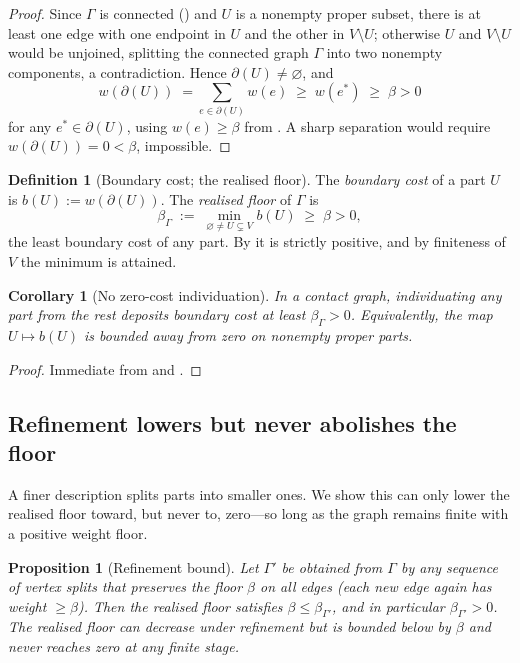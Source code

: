 \documentclass[11pt,a4paper]{article}
\theoremstyle{thmstyle}
\newtheorem{proposition}[theorem]{Proposition}
\newtheorem{corollary}[theorem]{Corollary}
\theoremstyle{definition}
\newtheorem{definition}[theorem]{Definition}
\theoremstyle{remark}
\newcommand{\Gph}{\Gamma}                 %
\newcommand{\V}{V}                        %
\newcommand{\wt}{w}                       %
\newcommand{\floorc}{\beta}               %
\newcommand{\cut}{\partial}               %
\begin{document}
\begin{proof}
Since $\Gph$ is connected () and $U$ is a nonempty proper
subset, there is at least one edge with one endpoint in $U$ and the other in
$\V\setminus U$; otherwise $U$ and $\V\setminus U$ would be unjoined, splitting
the connected graph $\Gph$ into two nonempty components, a contradiction. Hence
$\cut(U)\neq\varnothing$, and
\[
\wt(\cut(U))\;=\!\!\sum_{e\in\cut(U)}\!\!\wt(e)\;\ge\;\wt(e^\ast)\;\ge\;\floorc>0
\]
for any $e^\ast\in\cut(U)$, using $\wt(e)\ge\floorc$ from . A
sharp separation would require $\wt(\cut(U))=0<\floorc$, impossible.
\end{proof}

\begin{definition}[Boundary cost; the realised floor]
\label{def:boundarycost}
The \emph{boundary cost} of a part $U$ is $b(U):=\wt(\cut(U))$. The
\emph{realised floor} of $\Gph$ is
\[
\floorc_\Gph\;:=\;\min_{\varnothing\neq U\subsetneq\V} b(U)\;\ge\;\floorc>0,
\]
the least boundary cost of any part. By  it is strictly
positive, and by finiteness of $\V$ the minimum is attained.
\end{definition}

\begin{corollary}[No zero-cost individuation]
\label{cor:no-zero}
In a contact graph, individuating any part from the rest deposits boundary cost
at least $\floorc_\Gph>0$. Equivalently, the map $U\mapsto b(U)$ is bounded
away from zero on nonempty proper parts.
\end{corollary}

\begin{proof}
Immediate from  and .
\end{proof}

\subsection{Refinement lowers but never abolishes the floor}

A finer description splits parts into smaller ones. We show this can only lower
the realised floor toward, but never to, zero---so long as the graph remains
finite with a positive weight floor.

\begin{proposition}[Refinement bound]
\label{prop:refine}
Let $\Gph'$ be obtained from $\Gph$ by any sequence of vertex splits that
preserves the floor $\floorc$ on all edges \textup{(}each new edge again has
weight $\ge\floorc$\textup{)}. Then the realised floor satisfies
$\floorc\le\floorc_{\Gph'}$, and in particular $\floorc_{\Gph'}>0$. The realised
floor can decrease under refinement but is bounded below by $\floorc$ and never
reaches zero at any finite stage.
\end{proposition}
\end{document}

